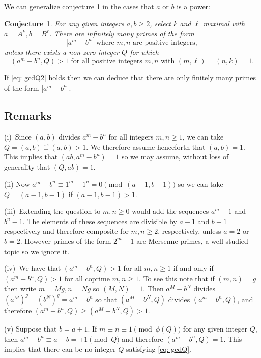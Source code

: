 \documentclass[12pt, a4paper,  reqno, english]{amsart}%
\numberwithin{equation}{section}
\newtheorem{conj}{Conjecture}
\theoremstyle{definition}
\renewcommand{\geq}{\geqslant}
\begin{document}
 We can generalize conjecture 1 in the cases that $a$ or $b$ is a  power:
  

\begin{conj}
For any given integers $a,b \geq 2$,  select $k$ and $\ell$  maximal
with $a=A^k, b=B^\ell$. There are infinitely many primes of the form
 \[
 |a^m-b^n| \text{ where } m,n \text{ are positive integers},
 \]
 unless there exists a non-zero integer $Q$ for which 
 \begin{equation} \label{eq: gcdQ2}
 (a^m-b^n , Q)>1 \text{ for all  positive integers } m,n \text{ with } (m,\ell)=(n,k)=1.
  \end{equation}
\end{conj}

 If \eqref{eq: gcdQ2} holds then we can deduce that there are only finitely many primes of the form $|a^m-b^n|$.
 


\subsection{Remarks}  \label{sec: Rmks}
(i)\ Since $(a,b)$ divides $a^m-b^n$ for all integers $m,n\ge1$,  we can take $Q=(a,b)$ if $(a,b)>1$. 
We therefore assume henceforth that $(a,b)=1$.  This implies that $(ab,a^m-b^n)=1$ so we may assume, without loss of generality that 
$(Q,ab)=1$.

(ii)  Now  $a^m-b^n\equiv 1^m-1^n=0 \pmod {(a-1,b-1)}$ so we can take $Q=(a-1,b-1)$ if $(a-1,b-1)>1$.
 
 (iii)\ Extending the question to $m,n\ge0$ would add the sequences $a^m-1$ and $b^n-1$. The elements of these sequences are divisible by $a-1$ and $b-1$ respectively and therefore composite for $m,n\ge2$, respectively, unless $a=2$ or $b=2$. However primes of the form $2^m-1$ are Mersenne primes, a well-studied topic so we ignore it.
 
 (iv)\ We have that $(a^m-b^n , Q)>1$ for all  $m,n\geq 1$ if and only if $(a^m-b^n , Q)>1$ for all coprime $m,n\geq 1$. To see this note that if 
 $(m,n)=g$ then write $m=Mg,n=Ng$ so $(M,N)=1$. Then $a^M-b^N$ divides $(a^M)^g-(b^N)^g=a^m-b^n$ so that 
  $(a^M-b^N,Q)$ divides $(a^m-b^n , Q)$, and therefore $(a^m-b^n , Q)\geq (a^M-b^N,Q)>1$.
  
  (v) Suppose that $b=a\pm 1$. If $m\equiv n\equiv 1 \pmod {\phi(Q)}$ for any given integer $Q$, then  $a^m-b^n\equiv a-b=\mp 1 \pmod Q$ and therefore $(a^m-b^n,Q)=1$. This implies that there can be no integer $Q$ satisfying \eqref{eq: gcdQ}.
 
\end{document}
